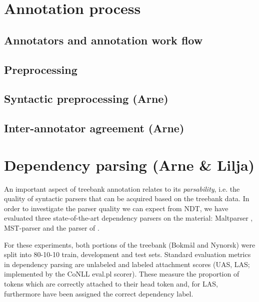 \documentclass[11pt,a4paper]{article}
\begin{document}
\section{Annotation process}
\subsection{Annotators and annotation work flow}
\subsection{Preprocessing}
\subsection{Syntactic preprocessing (Arne)}

\subsection{Inter-annotator agreement (Arne)}

\section{Dependency parsing (Arne \& Lilja)}
An important aspect of treebank annotation relates to its \emph{parsability},
i.e. the quality of syntactic parsers that can be acquired based on
the treebank data.  In order to investigate the parser quality we can
expect from NDT, we have evaluated three state-of-the-art dependency
parsers on the material: Maltparser ,
MST-parser  and the parser of
.  

For these experiments, both portions of the treebank (Bokm{\aa}l and
Nynorsk) were split into 80-10-10 train, development and test sets.
Standard evaluation metrics in dependency parsing are unlabeled and
labeled attachment scores (UAS, LAS; implemented by the CoNLL
\textsf{eval.pl} scorer).  These measure the proportion of tokens
which are correctly attached to their head token and, for LAS,
furthermore have been assigned the correct dependency label.
\end{document}
